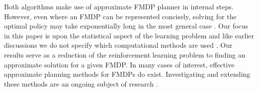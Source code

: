 \documentclass{article}
\begin{document}
Both algorithms make use of approximate FMDP planner in internal steps.
However, even where an FMDP can be represented concisely, solving for the optimal policy may take exponentially long in the most general case \cite{guestrin2003efficient}.
Our focus in this paper is upon the statistical aspect of the learning problem and like earlier discussions we do not specify which computational methods are used \cite{kearns1999efficient}.
Our results serve as a reduction of the reinforcement learning problem to finding an approximate solution for a given FMDP.
In many cases of interest, effective approximate planning methods for FMDPs do exist.
Investigating and extending these methods are an ongoing subject of research \cite{koller2000policy, guestrin2001max,delgado2011efficient,sanner2012approximate}.




\end{document}
